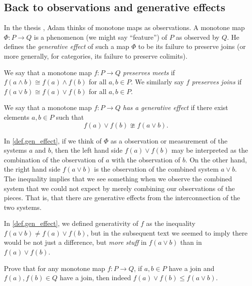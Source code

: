 \documentclass[7Sketches]{subfiles}
\begin{document}
%
%

\subsection{Back to observations and generative effects}

In the thesis \cite{Adam:2017a}, Adam thinks of monotone maps as observations. A monotone map $\Phi\colon P\to Q$ is a phenomenon (we might say ``feature'') of $P$ as observed by $Q$. He defines the \emph{generative effect} of such a map $\Phi$ to be its failure to preserve joins (or more generally, for categories, its failure to preserve colimits).%

\begin{definition}%
  We say that a monotone map $f\colon P \to Q$ \emph{preserves meets} if
$f(a \wedge b) \cong f(a) \wedge f(b)$ for all $a,b\in P$. We similarly say $f$
\emph{preserves joins} if $f(a \vee b) \cong f(a) \vee f(b)$ for all $a,b\in P$.
\end{definition}

\begin{definition}%
%
\label{def.gen_effect}
  We say that a monotone map $f\colon P \to Q$ \emph{has a generative
  effect} if there exist elements $a,b\in P$ such that
  \[
    f(a) \vee f(b) \ncong f(a \vee b).
  \]
\end{definition}

In \cref{def.gen_effect}, if we think of $\Phi$ as a observation or measurement of the systems $a$ and $b$, then
the left hand side $f(a) \vee f(b)$ may be interpreted as the combination of the observation of $a$ with
the observation of $b$. On the other hand, the right hand side $f(a \vee b)$ is the observation of the
combined system $a \vee b$. The inequality implies that we see something when we observe the combined system that we could not expect by merely combining our observations of the pieces. That is, that there are generative effects from the
interconnection of the two systems.

\begin{exercise}%
\label{exc.more_stuff}
In \cref{def.gen_effect}, we defined generativity of $f$ as the inequality $f(a \vee b)\neq f(a)\vee f(b)$, but in the subsequent text we seemed to imply there would be not just a difference, but \emph{more stuff} in $f(a \vee b)$ than in $f(a)\vee f(b)$.

Prove that for any monotone map $f\colon P\to Q$, if $a,b\in P$ have a join and $f(a),f(b)\in Q$ have a join, then indeed $f(a)\vee f(b)\leq f(a \vee b)$.
\end{exercise}
\end{document}
